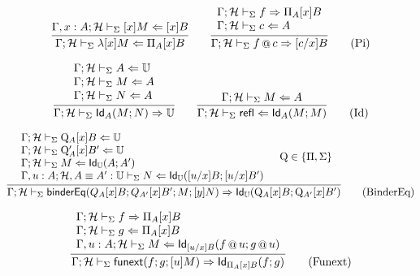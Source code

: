 \documentclass{amsart}
\begin{document}
\begin{equation}
  \infer{
    \Gamma;\mathcal{H}\vdash_\Sigma\lambda [x]M\checks\Pi_A[x]B
  }{
    \Gamma,x:A;\mathcal{H}\vdash_\Sigma [x]M\checks[x]B
  }
  \qquad
  \infer{
    \Gamma;\mathcal{H}\vdash_\Sigma f\mathop{@}c \infers [c/x]B
  }{
    \begin{array}{l}
      \Gamma;\mathcal{H}\vdash_\Sigma f\infers\Pi_A[x]B\\
      \Gamma;\mathcal{H}\vdash_\Sigma c\checks A
    \end{array}
  }
  \tag{Pi}
\end{equation}

\begin{equation}
  \infer{
    \Gamma;\mathcal{H}\vdash_\Sigma \mathsf{Id}_A(M;N)\infers\uni
  }{
    \begin{array}{l}
      \Gamma;\mathcal{H}\vdash_\Sigma A\checks\uni\\
      \Gamma;\mathcal{H}\vdash_\Sigma M\checks A\\
      \Gamma;\mathcal{H}\vdash_\Sigma N\checks A
    \end{array}
  }
  \qquad
  \infer{
    \Gamma;\mathcal{H}\vdash_\Sigma \mathsf{refl}\checks \mathsf{Id}_A(M;M)
  }{
    \Gamma;\mathcal{H}\vdash_\Sigma M\checks A
  }
  \tag{Id}
\end{equation}

\begin{equation}
  \infer{
    \Gamma;\mathcal{H}\vdash_\Sigma \mathsf{binderEq}(Q_A[x]B; Q_{A'}[x]B'; M; [y]N) \infers \mathsf{Id}_\uni(\mathrm{Q}_A[x]B;\mathrm{Q}_{A'}[x]B')
  }{
    \begin{array}{l}
      \Gamma;\mathcal{H}\vdash_\Sigma \mathrm{Q}_A[x]B \checks\uni\\
      \Gamma;\mathcal{H}\vdash_\Sigma \mathrm{Q}_A'[x]B' \checks\uni\\
      \Gamma;\mathcal{H}\vdash_\Sigma M \checks \mathsf{Id}_\uni(A; A')\\
      \Gamma,u:A;\mathcal{H},A\equiv A':\uni \vdash_\Sigma N\checks \mathsf{Id}_\uni([u/x]B; [u/x]B')
    \end{array}&
    \mathrm{Q}\in\{\Pi,\Sigma\}
  }
  \tag{BinderEq}
\end{equation}

\begin{equation}
  \infer{
    \Gamma;\mathcal{H}\vdash_\Sigma \mathsf{funext}(f; g; [u]M)\infers \mathsf{Id}_{\Pi_A[x]B}(f; g)
  }{
    \begin{array}{l}
      \Gamma;\mathcal{H}\vdash_\Sigma f\infers \Pi_A[x]B\\
      \Gamma;\mathcal{H}\vdash_\Sigma g\checks \Pi_A[x]B\\
      \Gamma,u:A;\mathcal{H}\vdash_\Sigma M\checks \mathsf{Id}_{[u/x]B}(f\mathop{@}u;g\mathop{@}u)
    \end{array}
  }
  \tag{Funext}
\end{equation}
\end{document}
